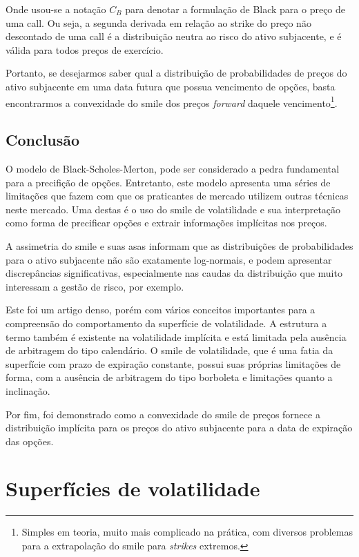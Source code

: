 \documentclass[]{book}
\let\rmarkdownfootnote\footnote%
\def\footnote{\protect\rmarkdownfootnote}
\theoremstyle{definition}
\theoremstyle{definition}
\theoremstyle{definition}
\theoremstyle{remark}
\begin{document}
Onde usou-se a notação \(C_B\) para denotar a formulação de Black para o preço de uma call. Ou seja, a segunda derivada em relação ao strike do preço não descontado de uma call é a distribuição neutra ao risco do ativo subjacente, e é válida para todos preços de exercício.

Portanto, se desejarmos saber qual a distribuição de probabilidades de preços do ativo subjacente em uma data futura que possua vencimento de opções, basta encontrarmos a convexidade do smile dos preços \emph{forward} daquele vencimento\footnote{Simples em teoria, muito mais complicado na prática, com diversos problemas para a extrapolação do smile para \emph{strikes} extremos.}.

\hypertarget{conclusao}{%
\section{Conclusão}\label{conclusao}}

O modelo de Black-Scholes-Merton, pode ser considerado a pedra fundamental para a precifição de opções. Entretanto, este modelo apresenta uma séries de limitações que fazem com que os praticantes de mercado utilizem outras técnicas neste mercado. Uma destas é o uso do smile de volatilidade e sua interpretação como forma de precificar opções e extrair informações implícitas nos preços.

A assimetria do smile e suas asas informam que as distribuições de probabilidades para o ativo subjacente não são exatamente log-normais, e podem apresentar discrepâncias significativas, especialmente nas caudas da distribuição que muito interessam a gestão de risco, por exemplo.

Este foi um artigo denso, porém com vários conceitos importantes para a compreensão do comportamento da superfície de volatilidade. A estrutura a termo também é existente na volatilidade implícita e está limitada pela ausência de arbitragem do tipo calendário. O smile de volatilidade, que é uma fatia da superfície com prazo de expiração constante, possui suas próprias limitações de forma, com a ausência de arbitragem do tipo borboleta e limitações quanto a inclinação.

Por fim, foi demonstrado como a convexidade do smile de preços fornece a distribuição implícita para os preços do ativo subjacente para a data de expiração das opções.

\hypertarget{superficies}{%
\chapter{Superfícies de volatilidade}\label{superficies}}
\end{document}
